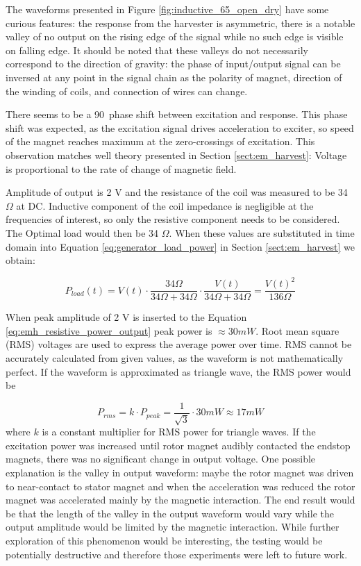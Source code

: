The waveforms presented in Figure \ref{fig:inductive_65_open_dry} have some curious features: the response from the harvester is asymmetric, there is a notable valley of no output on the rising edge of the signal while no such edge is visible on falling edge. It should be noted that these valleys do not necessarily correspond to the direction of gravity: the phase of input/output signal can be inversed at any point in the signal chain as the polarity of magnet, direction of the winding of coils, and connection of wires can change.

There seems to be a 90\degree \ phase shift between excitation and response. This phase shift was expected, as the excitation signal drives acceleration to exciter, so speed of the magnet reaches maximum at the zero-crossings of excitation. This observation matches well theory presented in Section \ref{sect:em_harvest}: Voltage is proportional to the rate of change of magnetic field. 

Amplitude of output is 2 V and the resistance of the coil was measured to be 34 $\Omega$ at DC. Inductive component of the coil impedance is negligible at the frequencies of interest, so only the resistive component needs to be considered. The Optimal load would then be 34 $\Omega$. When these values are substituted in time domain into Equation \ref{eq:generator_load_power} in Section \ref{sect:em_harvest} we obtain:

\begin{equation}\label{eq:emh_resistive_power_output}
  P_{load}(t) = V(t) \cdot \frac{ 34 \Omega }{ 34 \Omega + 34 \Omega } \cdot \frac{ V(t) }{ 34 \Omega + 34 \Omega } = \frac{V(t)^2}{136 \Omega}
\end{equation}

When peak amplitude of 2 V is inserted to the Equation \eqref{eq:emh_resistive_power_output} peak power is $ \approx 30 mW $. Root mean square (RMS) voltages are used to express the average power over time. RMS cannot be accurately calculated from given values, as the waveform is not  mathematically perfect. If the waveform is approximated as triangle wave, the RMS power would be 

\begin{equation} \label{eq:rms_power}
  P_{rms} = k \cdot P_{peak} = \frac{1}{\sqrt{3}} \cdot 30 mW \approx 17 mW 
\end{equation}
where $k$ is a constant multiplier for RMS power for triangle waves. 
If the excitation power was increased until rotor magnet audibly contacted the endstop magnets, there was no significant change in output voltage. One possible explanation is the valley in output waveform: maybe the rotor magnet was driven to near-contact to stator magnet and when the acceleration was reduced the rotor magnet was accelerated mainly by the magnetic interaction. The end result would be that the length of the valley in the output waveform would vary while the output amplitude would be limited by the magnetic interaction. While further exploration of this phenomenon would be interesting, the testing would be potentially destructive and therefore those experiments were left to future work.


